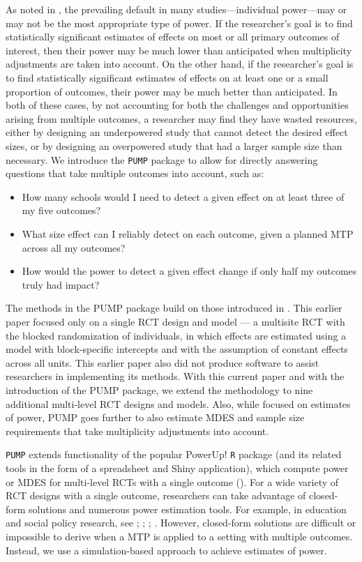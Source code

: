 \documentclass[
]{jss}
\providecommand{\tightlist}{%
  \setlength{\itemsep}{0pt}\setlength{\parskip}{0pt}}
\begin{document}
As noted in \citet{Porter2018}, the prevailing default in many
studies---individual power---may or may not be the most appropriate type
of power. If the researcher's goal is to find statistically significant
estimates of effects on most or all primary outcomes of interest, then
their power may be much lower than anticipated when multiplicity
adjustments are taken into account. On the other hand, if the
researcher's goal is to find statistically significant estimates of
effects on at least one or a small proportion of outcomes, their power
may be much better than anticipated. In both of these cases, by not
accounting for both the challenges and opportunities arising from
multiple outcomes, a researcher may find they have wasted resources,
either by designing an underpowered study that cannot detect the desired
effect sizes, or by designing an overpowered study that had a larger
sample size than necessary. We introduce the \texttt{PUMP} package to
allow for directly answering questions that take multiple outcomes into
account, such as:

\begin{itemize}
\tightlist
\item
  How many schools would I need to detect a given effect on at least
  three of my five outcomes?
\item
  What size effect can I reliably detect on each outcome, given a
  planned MTP across all my outcomes?
\item
  How would the power to detect a given effect change if only half my
  outcomes truly had impact?
\end{itemize}

The methods in the PUMP package build on those introduced in
\citet{Porter2018}. This earlier paper focused only on a single RCT
design and model --- a multisite RCT with the blocked randomization of
individuals, in which effects are estimated using a model with
block-specific intercepts and with the assumption of constant effects
across all units. This earlier paper also did not produce software to
assist researchers in implementing its methods. With this current paper
and with the introduction of the PUMP package, we extend the methodology
to nine additional multi-level RCT designs and models. Also, while
\citet{Porter2018} focused on estimates of power, PUMP goes further to
also estimate MDES and sample size requirements that take multiplicity
adjustments into account.

\texttt{PUMP} extends functionality of the popular PowerUp! \texttt{R}
package (and its related tools in the form of a spreadsheet and Shiny
application), which compute power or MDES for multi-level RCTs with a
single outcome (\citet{RN4473}). For a wide variety of RCT designs with
a single outcome, researchers can take advantage of closed-form
solutions and numerous power estimation tools. For example, in education
and social policy research, see \citet{RN4473}; \citet{RN30153};
\citet{RN23884}; \citet{RN24179}. However, closed-form solutions are
difficult or impossible to derive when a MTP is applied to a setting
with multiple outcomes. Instead, we use a simulation-based approach to
achieve estimates of power.
\end{document}
